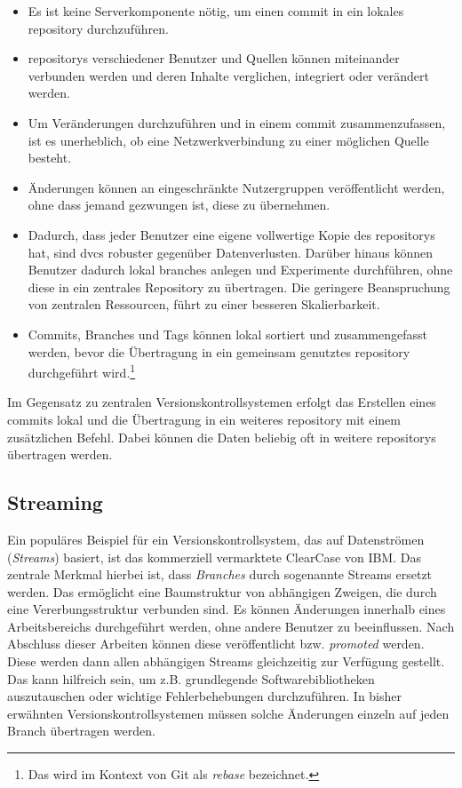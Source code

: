 \begin{itemize}
\item Es ist keine Serverkomponente nötig, um einen \gls{commit} in ein lokales
\gls{repository} durchzuführen.
\item \glspl{repository} verschiedener Benutzer und Quellen können miteinander
verbunden werden und deren Inhalte verglichen, integriert oder verändert werden.
\item Um Veränderungen durchzuführen und in einem \gls{commit} zusammenzufassen,
ist es unerheblich, ob eine Netzwerkverbindung zu einer möglichen Quelle besteht.
\item Änderungen können an eingeschränkte Nutzergruppen veröffentlicht werden,
ohne dass jemand gezwungen ist, diese zu übernehmen.
\item Dadurch, dass jeder Benutzer eine eigene vollwertige Kopie des
\glspl{repository} hat, sind \acrshort{dvcs} robuster gegenüber Datenverlusten.
Darüber hinaus können Benutzer dadurch lokal branches anlegen und Experimente
durchführen, ohne diese in ein zentrales Repository zu übertragen. Die
geringere Beanspruchung von zentralen Ressourcen, führt zu einer besseren
Skalierbarkeit.
\item Commits, Branches und Tags können lokal sortiert und zusammengefasst
werden, bevor die Übertragung in ein gemeinsam genutztes \gls{repository}
durchgeführt wird.\footnote{Das wird im Kontext von Git als \textit{rebase}
bezeichnet.}
\end{itemize}
Im Gegensatz zu zentralen Versionskontrollsystemen erfolgt das Erstellen eines
\glspl{commit} lokal und die Übertragung in ein weiteres \gls{repository} mit
einem zusätzlichen Befehl. Dabei können die Daten beliebig oft in weitere
\glspl{repository} übertragen werden.

\subsection{Streaming}\label{sec:streaming}
Ein populäres Beispiel für ein Versionskontrollsystem, das auf Datenströmen
(\textit{Streams}) basiert, ist das kommerziell vermarktete ClearCase von IBM.
Das zentrale Merkmal hierbei ist, dass \textit{Branches} durch sogenannte
Streams ersetzt werden. Das ermöglicht eine Baumstruktur von abhängigen
Zweigen, die durch eine Vererbungsstruktur verbunden sind. Es können Änderungen
innerhalb eines Arbeitsbereichs durchgeführt werden, ohne andere Benutzer zu
beeinflussen. Nach Abschluss dieser Arbeiten können diese veröffentlicht bzw.
\textit{promoted} werden. Diese werden dann allen abhängigen Streams
gleichzeitig zur Verfügung gestellt. Das kann hilfreich sein, um z.B.
grundlegende Softwarebibliotheken auszutauschen oder wichtige Fehlerbehebungen
durchzuführen. In bisher erwähnten Versionskontrollsystemen müssen solche
Änderungen einzeln auf jeden Branch übertragen werden.
